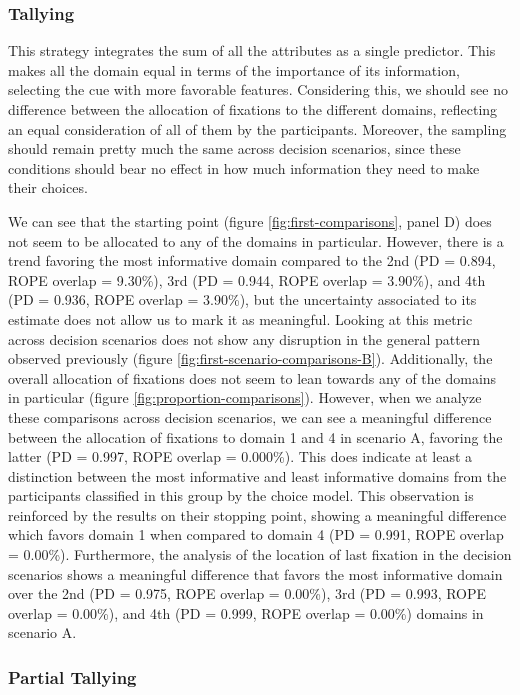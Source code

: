 \documentclass[
  english,
  man]{apa6}
\begin{document}
\hypertarget{tallying}{%
\subsubsection{Tallying}\label{tallying}}

This strategy integrates the sum of all the attributes as a single predictor. This makes all the domain equal in terms of the importance of its information, selecting the cue with more favorable features. Considering this, we should see no difference between the allocation of fixations to the different domains, reflecting an equal consideration of all of them by the participants. Moreover, the sampling should remain pretty much the same across decision scenarios, since these conditions should bear no effect in how much information they need to make their choices.

We can see that the starting point (figure \ref{fig:first-comparisons}, panel D) does not seem to be allocated to any of the domains in particular. However, there is a trend favoring the most informative domain compared to the 2nd (PD = 0.894, ROPE overlap = 9.30\%), 3rd (PD = 0.944, ROPE overlap = 3.90\%), and 4th (PD = 0.936, ROPE overlap = 3.90\%), but the uncertainty associated to its estimate does not allow us to mark it as meaningful. Looking at this metric across decision scenarios does not show any disruption in the general pattern observed previously (figure \ref{fig:first-scenario-comparisons-B}). Additionally, the overall allocation of fixations does not seem to lean towards any of the domains in particular (figure \ref{fig:proportion-comparisons}). However, when we analyze these comparisons across decision scenarios, we can see a meaningful difference between the allocation of fixations to domain 1 and 4 in scenario A, favoring the latter (PD = 0.997, ROPE overlap = 0.000\%). This does indicate at least a distinction between the most informative and least informative domains from the participants classified in this group by the choice model. This observation is reinforced by the results on their stopping point, showing a meaningful difference which favors domain 1 when compared to domain 4 (PD = 0.991, ROPE overlap = 0.00\%). Furthermore, the analysis of the location of last fixation in the decision scenarios shows a meaningful difference that favors the most informative domain over the 2nd (PD = 0.975, ROPE overlap = 0.00\%), 3rd (PD = 0.993, ROPE overlap = 0.00\%), and 4th (PD = 0.999, ROPE overlap = 0.00\%) domains in scenario A.

\hypertarget{partial-tallying}{%
\subsubsection{Partial Tallying}\label{partial-tallying}}
\end{document}
